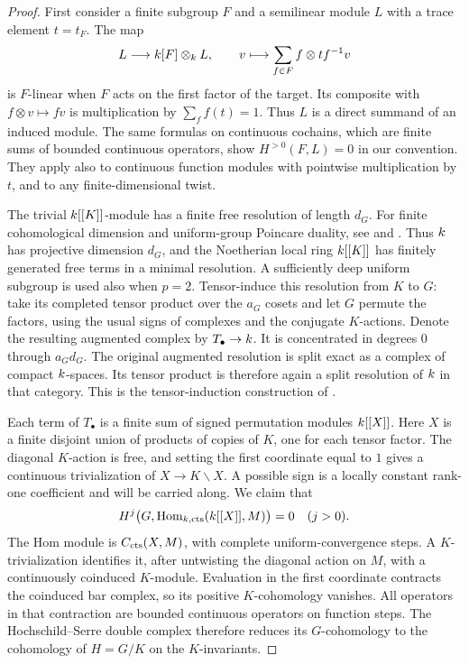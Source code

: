 \begin{proof}
First consider a finite subgroup $F$ and a semilinear module $L$ with
a trace element $t=t_F$.  The map
\[
 L\longrightarrow k[F]\otimes_k L,
 \qquad v\longmapsto\sum_{f\in F}f\otimes t f^{-1}v
\]
is $F$-linear when $F$ acts on the first factor of the target.  Its
composite with $f\otimes v\mapsto fv$ is multiplication by
$\sum_f f(t)=1$.  Thus $L$ is a direct summand of an induced module.
The same formulas on continuous cochains, which are finite sums of
bounded continuous operators, show $H^{>0}(F,L)=0$ in our convention.
They apply also to continuous function modules with pointwise
multiplication by $t$, and to any finite-dimensional twist.

The trivial $k[[K]]$-module has a finite free resolution of length
$d_G$.  For finite cohomological dimension and uniform-group Poincare
duality, see \citet[Chapter~V, Proposition~2.5.7.1 and
Theorem~2.5.8]{lazard1965} and \citet[Lemma~4.15 and
Proposition~4.16]{bghs}.  Thus $k$ has projective dimension $d_G$,
and the Noetherian local ring $k[[K]]$ has finitely generated
free terms in a minimal resolution.  A sufficiently deep uniform
subgroup is used also when $p=2$.
Tensor-induce this resolution from $K$ to $G$:
take its completed tensor product over the $a_G$ cosets and let $G$
permute the factors, using the usual signs of complexes and the
conjugate $K$-actions.  Denote the resulting augmented complex by
$T_\bullet\to k$.  It is concentrated in degrees $0$ through
$a_Gd_G$.  The original augmented resolution is split exact as a
complex of compact $k$-spaces.  Its tensor product is therefore
again a split resolution of $k$ in that category.  This is the
tensor-induction construction of
\citet[Theorem~5.2]{symonds2007}.

Each term of $T_\bullet$ is a finite sum of signed permutation modules
$k[[X]]$.  Here $X$ is a finite disjoint union of products of copies
of $K$, one for each tensor factor.  The diagonal $K$-action is free,
and setting the first coordinate equal to $1$ gives a continuous
trivialization of $X\to K\backslash X$.  A possible sign is a
locally constant rank-one coefficient and will be carried along.
We claim that
\begin{equation}
 H^j\bigl(G,\operatorname{Hom}_{k,\mathrm{cts}}(k[[X]],M)\bigr)=0\quad(j>0).
 \label{eq:cts-permutation-acyclic}
\end{equation}
The Hom module is $C_{\mathrm{cts}}(X,M)$, with complete uniform-convergence
steps.  A $K$-trivialization identifies it, after untwisting the
diagonal action on $M$, with a continuously coinduced $K$-module.
Evaluation in the first coordinate contracts the coinduced bar
complex, so its positive $K$-cohomology vanishes.  All operators in
that contraction are bounded continuous operators on function
steps.  The Hochschild--Serre double complex therefore reduces its
$G$-cohomology to the cohomology of $H=G/K$ on the $K$-invariants.


\end{proof}
